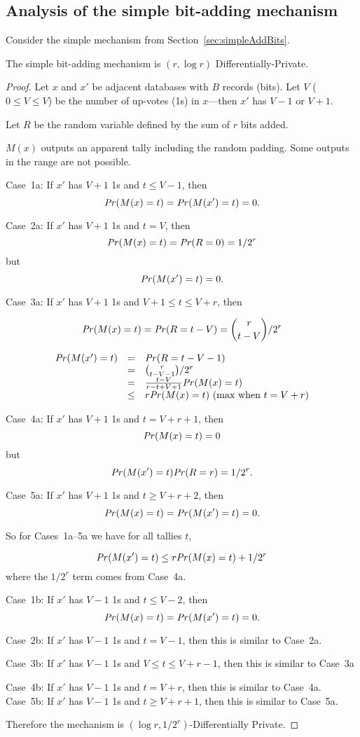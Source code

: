 \documentclass[10pt,a4paper]{article}
\begin{document}
\subsection{Analysis of the simple bit-adding mechanism}
Consider the simple mechanism from Section~\ref{sec:simpleAddBits}.

\begin{prop}
The simple bit-adding mechanism is $(r, \log r)$ Differentially-Private.
\end{prop}
\begin{proof}
Let $x$ and $x'$ be adjacent databases with $B$ records (bits). Let $V$ ($0 \leq V \leq V$) be the number of up-votes (1s) in $x$---then $x'$ has $V-1$ or $V+1$.

Let $R$ be the random variable defined by the sum of $r$ bits added.

$M(x)$ outputs an apparent tally including the random padding. Some outputs in the range are not possible.

Case~1a: If $x'$ has $V+1$ 1s and $t \leq V-1$, then 
$$\mathit{Pr}(M(x) = t) = \mathit{Pr}(M(x')=t) = 0.$$


Case~2a: If $x'$ has $V+1$ 1s and $t = V$, then
$$\mathit{Pr}(M(x) = t) = \mathit{Pr}(R = 0) = 1 / 2^r$$ 
but
$$\mathit{Pr}(M(x') = t) = 0.$$ 

Case~3a: If $x'$ has $V+1$ 1s and $V+1 \leq t \leq V+r$, then 

$$\mathit{Pr}(M(x) = t) = \mathit{Pr}(R = t-V) = {r \choose {t-V}} / 2^r$$ 

$$
\begin{array}{rcl}
\mathit{Pr}(M(x') = t) & = & \mathit{Pr}(R = t-V-1) \\
				 & = & {r \choose {t-V-1}} / 2^r \\
				 & = & \frac{t-V}{r-t+V+1}     \mathit{Pr}(M(x) = t) \\
				 & \leq & r \mathit{Pr}(M(x) = t)  \text{       (max when $t=V+r$)}
\end{array}
$$

Case~4a: If $x'$ has $V+1$ 1s and $t = V+r+1$, then 
$$\mathit{Pr}(M(x) = t) = 0 $$
but
$$\mathit{Pr}(M(x') = t)  \mathit{Pr}(R = r) = 1 / 2^r.$$ 

Case~5a: If $x'$ has $V+1$ 1s and $t \geq V+r+2$, then 
$$\mathit{Pr}(M(x) = t) = \mathit{Pr}(M(x')=t) = 0.$$

So for Cases~1a--5a we have for all tallies $t$,

$$\mathit{Pr}(M(x') = t) \leq r \mathit{Pr}(M(x) = t) + 1/2^r$$  where the $1/2^r$ term comes from Case~4a.

Case~1b: If $x'$ has $V-1$ 1s and $t \leq V-2$, then 
$$\mathit{Pr}(M(x) = t) = \mathit{Pr}(M(x')=t) = 0.$$

Case~2b: If $x'$ has $V-1$ 1s and $t=V-1$, then this is similar to Case~2a.

Case~3b: If $x'$ has $V-1$ 1s and $V \leq t \leq V+r-1$, then this is similar to Case~3a

Case~4b: If $x'$ has $V-1$ 1s and $t = V+r$, then this is similar to Case~4a.
Case~5b: If $x'$ has $V-1$ 1s and $t \geq V+r+1$, then this is similar to Case~5a.

Therefore the mechanism is $(\log r, 1/2^r)$-Differentially Private.
\end{proof}
\end{document}

